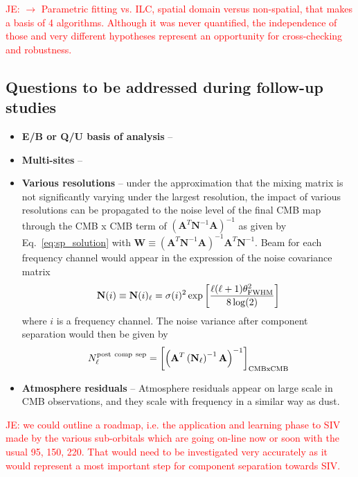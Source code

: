 \textcolor{red}{JE: $\rightarrow$ Parametric fitting vs. ILC, spatial domain versus non-spatial, that makes a basis of 4 algorithms. Although it was never quantified, the independence of those and very different hypotheses represent an opportunity for cross-checking and robustness.}

\subsection{Questions to be addressed during follow-up studies}
\begin{itemize}
	\item \textbf{E/B or Q/U basis of analysis} -- 
	\item \textbf{Multi-sites} -- 
	\item \textbf{Various resolutions} -- under the approximation that the mixing matrix is not significantly varying under the largest resolution, the impact of various resolutions can be propagated to the noise level of the final CMB map through the CMB x CMB term of $\left(\mathbf{A}^T\mathbf{N}^{-1}\mathbf{A}\right)^{-1}$ as given by Eq.~\ref{eq:sp_solution} with $\mathbf{W} \equiv \left( \mathbf{A}^T\mathbf{N}^{-1}\mathbf{A} \right)^{-1}\mathbf{A}^T\mathbf{N}^{-1}$. Beam for each frequency channel would appear in the expression of the noise covariance matrix 
	\begin{eqnarray}
		\centering
			\mathbf{N}(i) \equiv \mathbf{N}(i)_\ell = \sigma(i)^2\exp\left[ \frac{\ell(\ell+1)\theta_{\rm FWHM}^2}{8\log(2)} \right]
	\end{eqnarray}
	where $i$ is a frequency channel. The noise variance after component separation would then be given by
	\begin{eqnarray}
		\centering
			N_\ell^{\rm post\ comp\ sep} = \left[\left(\mathbf{A}^T\left(\mathbf{N}_\ell\right)^{-1}\mathbf{A}\right)^{-1}\right]_{\rm CMBxCMB}
	\end{eqnarray}
	\item \textbf{Atmosphere residuals} -- Atmosphere residuals appear on large scale in CMB observations, and they scale with frequency in a similar way as dust. 
\end{itemize}

\textcolor{red}{JE: we could outline a roadmap, i.e. the application and learning phase to SIV made by the various sub-orbitals which are going on-line now or soon with the usual 95, 150, 220. That would need to be investigated very accurately as it would represent a most important step for component separation towards SIV.}



%



